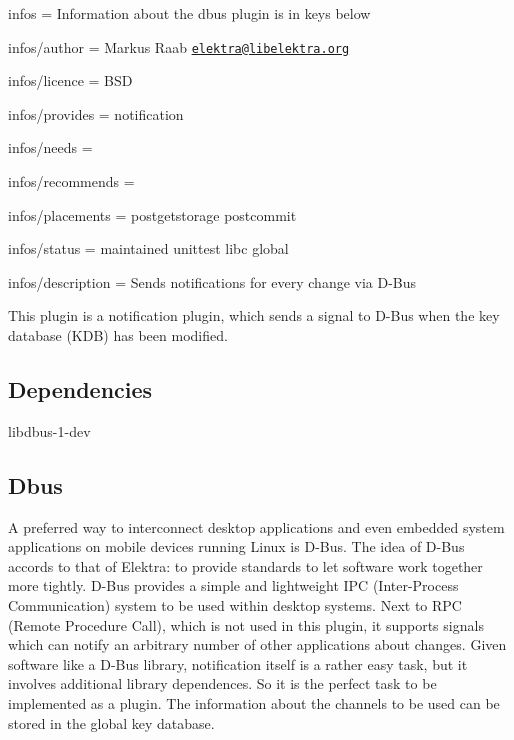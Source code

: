 
\begin{DoxyItemize}
\item infos = Information about the dbus plugin is in keys below
\item infos/author = Markus Raab \href{mailto:elektra@libelektra.org}{\tt elektra@libelektra.\+org}
\item infos/licence = B\+SD
\item infos/provides = notification
\item infos/needs =
\item infos/recommends =
\item infos/placements = postgetstorage postcommit
\item infos/status = maintained unittest libc global
\item infos/description = Sends notifications for every change via D-\/\+Bus
\end{DoxyItemize}

This plugin is a notification plugin, which sends a signal to D-\/\+Bus when the key database (K\+DB) has been modified.

\subsection*{Dependencies}


\begin{DoxyItemize}
\item {\ttfamily libdbus-\/1-\/dev}
\end{DoxyItemize}

\subsection*{Dbus}

A preferred way to interconnect desktop applications and even embedded system applications on mobile devices running Linux is D-\/\+Bus. The idea of D-\/\+Bus accords to that of Elektra\+: to provide standards to let software work together more tightly. D-\/\+Bus provides a simple and lightweight I\+PC (Inter-\/\+Process Communication) system to be used within desktop systems. Next to R\+PC (Remote Procedure Call), which is not used in this plugin, it supports signals which can notify an arbitrary number of other applications about changes. Given software like a D-\/\+Bus library, notification itself is a rather easy task, but it involves additional library dependences. So it is the perfect task to be implemented as a plugin. The information about the channels to be used can be stored in the global key database.

